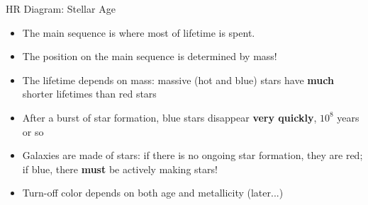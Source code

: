 \documentclass[letterpaper,landscape]{slides}
\begin{document}
\begin{slide}
{\begin{minipage}[t]{12cm}
\begin{center}
\vskip -1in
{\large \color{red} HR Diagram: Stellar Age }
\end{center}


\begin{itemize}
\item {\color{blue} The main sequence} is where most of lifetime is spent.
\item {\color{blue} The position on the main sequence} is determined by mass! 
\item {\color{blue} The lifetime depends on mass:} massive (hot and blue) stars
                    have {\bf much} shorter lifetimes than red stars
\item {\color{blue} After a burst of star formation,} blue stars disappear 
                    {\bf very quickly}, $10^8$ years or so
\item {\color{blue} Galaxies are made of stars:} if there is no ongoing 
         star formation, they are red; if blue, there {\bf must} be actively
         making stars!
\item Turn-off color depends on both age and metallicity (later...) 
\end{itemize}

\end{minipage}}
\vfill 
\end{slide}
\end{document}
